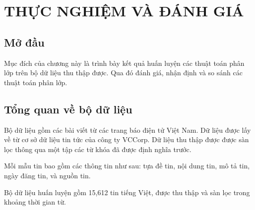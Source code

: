 \chapter{THỰC NGHIỆM VÀ ĐÁNH GIÁ}
\ifpdf
    \graphicspath{{Chapter4/Chapter4Figs/PNG/}{Chapter4/Chapter4Figs/PDF/}{Chapter4/Chapter4Figs/}}
\else
    \graphicspath{{Chapter4/Chapter4Figs/EPS/}{Chapter4/Chapter4Figs/}}
\fi

\section{Mở đầu}
Mục đích của chương này là trình bày kết quả huấn luyện các thuật toán phân lớp trên bộ dữ liệu thu thập được. Qua đó đánh giá, nhận định và so sánh các thuật toán phân lớp.

\section{Tổng quan về bộ dữ liệu}
Bộ dữ liệu gồm các bài viết từ các trang báo điện tử Việt Nam. Dữ liệu được lấy về từ cơ sở dữ liệu tin tức của công ty VCCorp\@. Dữ liệu thu thập được được sàn lọc thông qua một tập các từ khóa đã được định nghĩa trước.

Mỗi mẫu tin bao gồm các thông tin như sau: tựa đề tin, nội dung tin, mô tả tin, ngày đăng tin, và nguồn tin.

Bộ dữ liệu huấn luyện gồm 15,612 tin tiếng Việt, được thu thập và sàn lọc trong khoảng thời gian từ.

